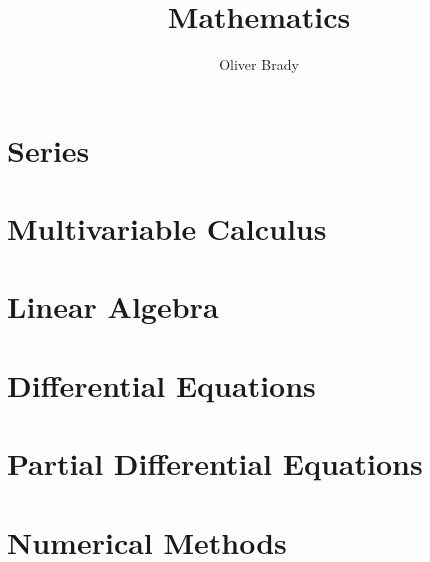 \documentclass[]{article}
\title{Mathematics}
\author{Oliver Brady}
\begin{document}
\maketitle
\tableofcontents


\section{Series}
\section{Multivariable Calculus}
\section{Linear Algebra}
\section{Differential Equations}
\section{Partial Differential Equations}


\section{Numerical Methods}
\end{document}
